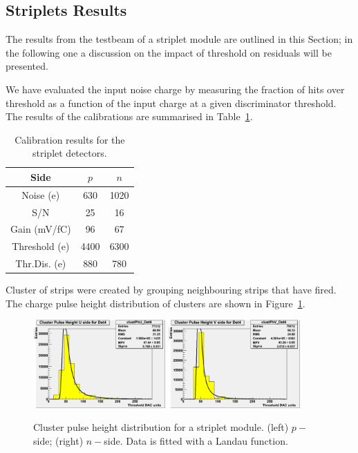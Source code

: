 \subsection{Striplets Results}

The results from the testbeam of a striplet module are outlined in this Section; in the following one
a discussion on the impact of threshold on residuals will be presented.

We have evaluated the input noise charge by measuring the fraction of hits over
 threshold as a
function of the input charge at a given discriminator threshold.
The results of the calibrations are summarised in Table~\ref{tab:FSSR2Calib}.


\begin{table}[hbt]
\begin{center}
\caption{Calibration results for the striplet detectors.
\label{tab:FSSR2Calib}}
\vspace{\baselineskip}
\begin{tabular}{|c|c|c|}
\hline

Side & $p$  & $n$ \\

\hline
Noise (e)& 630       & 1020   \\
S/N      & 25        & 16         \\
Gain (mV/fC)& 96     & 67         \\
Threshold (e) & 4400 & 6300 \\
Thr.Dis. (e)& 880       & 780\\ \hline
\end{tabular}
\end{center}
\end{table}

Cluster of strips were created by grouping neighbouring strips that have fired. The charge pulse height 
distribution of clusters are shown in Figure~\ref{fig:clu_ph_striplets}.
\begin{figure}[!htpb]
\centering
\includegraphics[width=0.45\textwidth]{p_side_striplets.png}
\includegraphics[width=0.45\textwidth]{n_side_striplets.png}
\caption{\label{fig:clu_ph_striplets}Cluster pulse height distribution for a striplet module. (left) $p-$ side; 
(right) $n-$side. Data is fitted with a Landau function.}
\end{figure}

